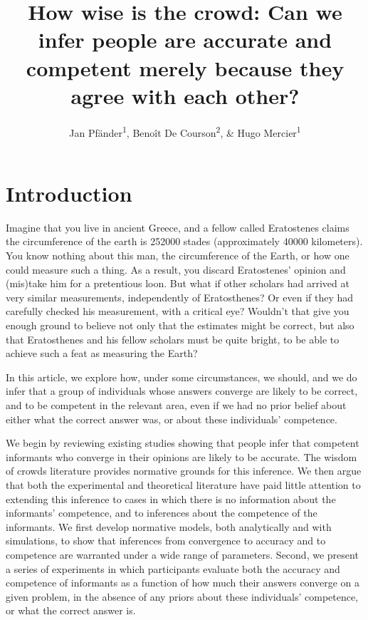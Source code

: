 \documentclass[
  doc,floatsintext]{apa6}
\title{How wise is the crowd: Can we infer people are accurate and competent merely because they agree with each other?}
\author{Jan Pfänder\textsuperscript{1}, Benoît De Courson\textsuperscript{2}, \& Hugo Mercier\textsuperscript{1}}
\date{}
\affiliation{\vspace{0.5cm}\textsuperscript{1} Institut Jean Nicod, Département d'études cognitives, ENS, EHESS, PSL University, CNRS, France\\\textsuperscript{2} Max Planck Institute for the Study of Crime, Security and Law, Freiburg im Breisgau, Germany}
\begin{document}
\maketitle

\newpage

\section{Introduction}\label{introduction}

Imagine that you live in ancient Greece, and a fellow called Eratostenes claims the circumference of the earth is 252000 stades (approximately 40000 kilometers). You know nothing about this man, the circumference of the Earth, or how one could measure such a thing. As a result, you discard Eratostenes' opinion and (mis)take him for a pretentious loon. But what if other scholars had arrived at very similar measurements, independently of Eratosthenes? Or even if they had carefully checked his measurement, with a critical eye? Wouldn't that give you enough ground to believe not only that the estimates might be correct, but also that Eratosthenes and his fellow scholars must be quite bright, to be able to achieve such a feat as measuring the Earth?

In this article, we explore how, under some circumstances, we should, and we do infer that a group of individuals whose answers converge are likely to be correct, and to be competent in the relevant area, even if we had no prior belief about either what the correct answer was, or about these individuals' competence.

We begin by reviewing existing studies showing that people infer that competent informants who converge in their opinions are likely to be accurate. The wisdom of crowds literature provides normative grounds for this inference. We then argue that both the experimental and theoretical literature have paid little attention to extending this inference to cases in which there is no information about the informants' competence, and to inferences about the competence of the informants. We first develop normative models, both analytically and with simulations, to show that inferences from convergence to accuracy and to competence are warranted under a wide range of parameters. Second, we present a series of experiments in which participants evaluate both the accuracy and competence of informants as a function of how much their answers converge on a given problem, in the absence of any priors about these individuals' competence, or what the correct answer is.
\end{document}
